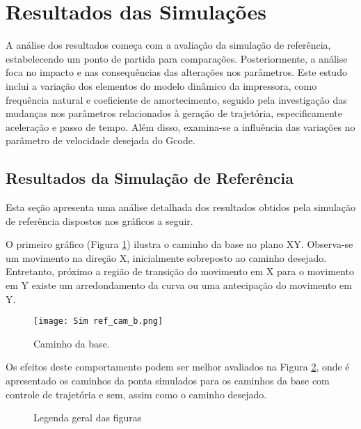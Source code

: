\section{Resultados das Simulações}
A análise dos resultados começa com a avaliação da simulação de referência, estabelecendo um ponto de partida para comparações. Posteriormente, a análise foca no impacto e nas consequências das alterações nos parâmetros. Este estudo inclui a variação dos elementos do modelo dinâmico da impressora, como frequência natural e coeficiente de amortecimento, seguido pela investigação das mudanças nos parâmetros relacionados à geração de trajetória, especificamente aceleração e passo de tempo. Além disso, examina-se a influência das variações no parâmetro de velocidade desejada do Gcode.

\subsection{Resultados da Simulação de Referência}
Esta seção apresenta uma análise detalhada dos resultados obtidos pela simulação de referência dispostos nos gráficos a seguir.

O primeiro gráfico (Figura \ref{fig:ref_cam_b}) ilustra o caminho da base no plano XY. Observa-se um movimento na direção X, inicialmente sobreposto ao caminho desejado. Entretanto, próximo a região de transição do movimento em X para o movimento em Y existe um arredondamento da curva ou uma antecipação do movimento em Y.

\begin{figure}[H]
    \centering
    \caption{Caminho da base.}
    \texttt{[image: Sim ref\_cam\_b.png]}

    \label{fig:ref_cam_b}
\end{figure}

Os efeitos deste comportamento podem ser melhor avaliados na Figura \ref{fig:ref_cam_p_s}, onde é apresentado os caminhos da ponta simulados para os caminhos da base com controle de trajetória e sem, assim como o caminho desejado.

\begin{figure}[H]
    \centering
    \hfill
    \caption{Legenda geral das figuras}
    \label{fig:ref_cam_p_s}
\end{figure}

